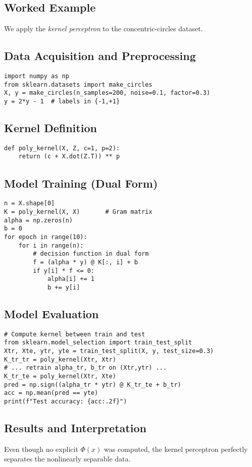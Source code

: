 \documentclass[11pt]{article}
\begin{document}
\subsection{Worked Example}
We apply the \emph{kernel perceptron} to the concentric-circles dataset.

\subsection{Data Acquisition and Preprocessing}
\begin{lstlisting}
import numpy as np
from sklearn.datasets import make_circles
X, y = make_circles(n_samples=200, noise=0.1, factor=0.3)
y = 2*y - 1  # labels in {-1,+1}
\end{lstlisting}

\subsection{Kernel Definition}
\begin{lstlisting}
def poly_kernel(X, Z, c=1, p=2):
    return (c + X.dot(Z.T)) ** p
\end{lstlisting}

\subsection{Model Training (Dual Form)}
\begin{lstlisting}
n = X.shape[0]
K = poly_kernel(X, X)       # Gram matrix
alpha = np.zeros(n)
b = 0
for epoch in range(10):
    for i in range(n):
        # decision function in dual form
        f = (alpha * y) @ K[:, i] + b
        if y[i] * f <= 0:
            alpha[i] += 1
            b += y[i]
\end{lstlisting}

\subsection{Model Evaluation}
\begin{lstlisting}
# Compute kernel between train and test
from sklearn.model_selection import train_test_split
Xtr, Xte, ytr, yte = train_test_split(X, y, test_size=0.3)
K_tr_tr = poly_kernel(Xtr, Xtr)
# ... retrain alpha_tr, b_tr on (Xtr,ytr) ...
K_tr_te = poly_kernel(Xtr, Xte)
pred = np.sign((alpha_tr * ytr) @ K_tr_te + b_tr)
acc = np.mean(pred == yte)
print(f"Test accuracy: {acc:.2f}")
\end{lstlisting}

\subsection{Results and Interpretation}
Even though no explicit $\Phi(x)$ was computed, the kernel perceptron perfectly separates the nonlinearly separable data.
\end{document}
